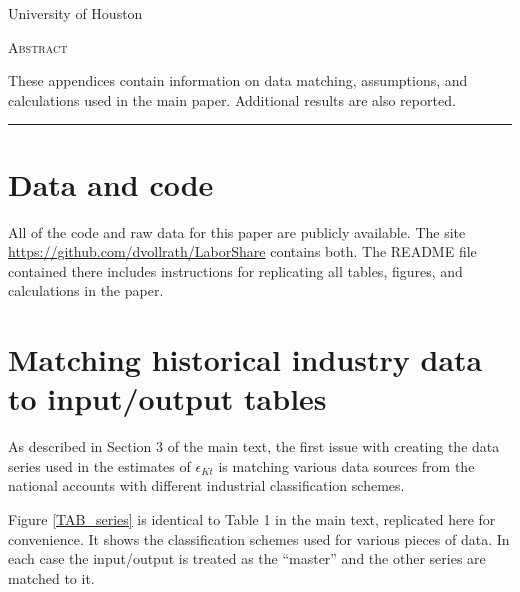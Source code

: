 \documentclass[11pt]{article}
\begin{document}
\begin{titlepage}
\vspace{2in} \noindent {\large \today}

\vspace{.5in} 

\vspace{.25in} 

\vspace{.05in} \noindent University of Houston

\vfill \noindent \textsc{Abstract} \hrulefill

\vspace{.05in} \noindent These appendices contain information on data matching, assumptions, and calculations used in the main paper. Additional results are also reported.
 
\vspace{.1in} \hrule

\vspace{.1in} 
\end{titlepage}

\pagebreak 

\tableofcontents
\listoffigures
\listoftables

\section{Data and code}
\onehalfspacing All of the code and raw data for this paper are publicly available. The site \url{https://github.com/dvollrath/LaborShare} contains both. The README file contained there includes instructions for replicating all tables, figures, and calculations in the paper. 

\section{Matching historical industry data to input/output tables}
As described in Section 3 of the main text, the first issue with creating the data series used in the estimates of $\epsilon_{Kt}$ is matching various data sources from the national accounts with different industrial classification schemes. 

Figure \ref{TAB_series} is identical to Table 1 in the main text, replicated here for convenience. It shows the classification schemes used for various pieces of data. In each case the input/output is treated as the ``master'' and the other series are matched to it. 
\end{document}
